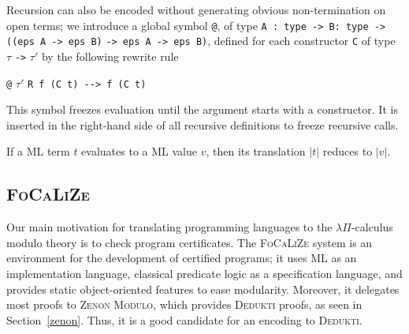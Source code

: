 \documentclass[english]{lipics}
\newcommand\lra{\longrightarrow}
\newcommand\lst[1]{{\rm \lstinline{#1}}}
\begin{document}
Recursion can also be encoded without generating obvious
non-termination on open terms; we introduce a global symbol \lst{@},
of type
\lst{A : type -> B: type -> ((eps A -> eps B)} \lst{-> eps A -> eps B)},
defined for each constructor \lst{C} of type $\tau$ \lst{->} $\tau'$ by the
following rewrite rule
\begin{center}
\lst{@} $\tau'$ \lst{R f (C t) --> f (C t)}
\end{center}

This symbol freezes evaluation until the argument
starts with a constructor. It is inserted in the right-hand side
of all recursive definitions to freeze recursive calls.

\begin{lemma}
  If a ML term $t$ evaluates to a ML value $v$, then its translation
  $|t|$ reduces to $|v|$.
\end{lemma}

\subsection{\textsc{FoCaLiZe}}

Our main motivation for translating programming languages to the
$\lambda\Pi$-calculus modulo theory is to check program
certificates.  The \textsc{FoCaLiZe}
system \cite{FoCaLiZe} is an environment for
the development of certified programs; it uses ML as an implementation
language, classical predicate logic as a specification language, and
provides static object-oriented features to ease
modularity. Moreover, it delegates most proofs to \textsc{Zenon
  Modulo}, which provides \textsc{Dedukti} proofs, as seen in
Section~\ref{zenon}. Thus, it is a good candidate for an encoding to
\textsc{Dedukti}.
\end{document}
